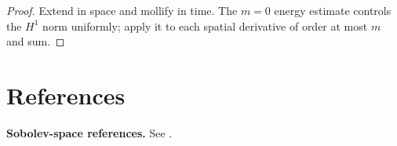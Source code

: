 \begin{proof}
\sketch Extend in space and mollify in time. The $m=0$ energy estimate controls the $H^1$ norm uniformly; apply it to each spatial derivative of order at most $m$ and sum.
\end{proof}

\section{References}
\label{sec:sobolev-references}
\textbf{Sobolev-space references.} See \cite{GilbargTrudinger1983,LiebLoss1997,Ziemer1989,EvansGariepy1992,Temam1977}.
